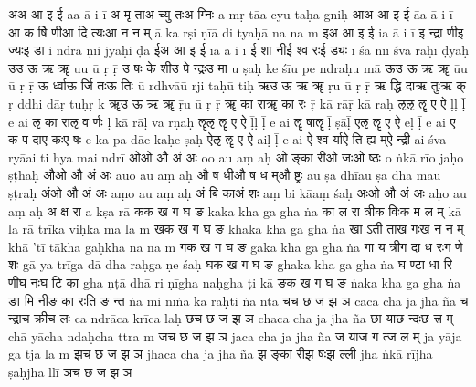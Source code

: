 \documentclass{article}
\begin{document}
\card
{अ}{अ आ इ ई}%
{a}{a ā i ī}
{{अ मृ ता}{अ च्यु तः}{अ ग्निः}}%
{{a mṛ tā}{a cyu taḥ}{a gniḥ}}
\card
{आ}{अ आ इ ई}%
{ā}{a ā i ī}
{{आ क र्षि णी}{आ दि त्यः}{आ न न म्}}%
{{ā ka rṣi ṇī}{ā di tyaḥ}{ā na na m}}
\card
{इ}{अ आ इ ई}%
{i}{a ā i ī}
{{इ न्द्रा णी}{इ ज्यः}{इ डा}}%
{{i ndrā ṇī}{i jyaḥ}{i ḍā}}
\card
{ई}{अ आ इ ई}%
{ī}{a ā i ī}
{{ई शा नी}{ई श्व रः}{ई ड्यः}}%
{{ī śā nī}{ī śva raḥ}{ī ḍyaḥ}}
\card
{उ}{उ ऊ ऋ ॠ}%
{u}{u ū ṛ ṝ}
{{उ षः के शी}{उ पे न्द्रः}{उ मा}}%
{{u ṣaḥ ke śī}{u pe ndraḥ}{u mā}}
\card
{ऊ}{उ ऊ ऋ ॠ}%
{ū}{u ū ṛ ṝ}
{{ऊ र्ध्वा}{ऊ र्जि तः}{ऊ तिः}}%
{{ū rdhvā}{ū rji taḥ}{ū tiḥ}}
\card
{ऋ}{उ ऊ ऋ ॠ}%
{ṛ}{u ū ṛ ṝ}
{{ऋ द्धि दा}{ऋ तुः}{ऋ क्}}%
{{ṛ ddhi dā}{ṛ tuḥ}{ṛ k}}
\card
{ॠ}{उ ऊ ऋ ॠ}%
{ṝ}{u ū ṛ ṝ}
{{ॠ का रा}{ॠ का रः}{ }}%
{{ṝ kā rā}{ṝ kā raḥ}{ }}
\card
{ऌ}{ऌ ॡ ए ऐ}%
{ḷ}{ḷ ḹ e ai}
{{ऌ का रा}{ऌ व र्णः}{ }}%
{{ḷ kā rā}{ḷ va rṇaḥ}{ }}
\card
{ॡ}{ऌ ॡ ए ऐ}%
{ḹ}{ḷ ḹ e ai}
{{ॡ षा}{ॡ}{ }}%
{{ḹ ṣā}{ḹ}{ }}
\card
{ए}{ऌ ॡ ए ऐ}%
{e}{ḷ ḹ e ai}
{{ए क प दा}{ए कः}{ए षः}}%
{{e ka pa dā}{e kaḥ}{e ṣaḥ}}
\card
{ऐ}{ऌ ॡ ए ऐ}%
{ai}{ḷ ḹ e ai}
{{ऐ श्व र्या}{ऐ ति ह्य म्}{ऐ न्द्री}}%
{{ai śva ryā}{ai ti hya m}{ai ndrī}}
\card
{ओ}{ओ औ अं अः}%
{o}{o au aṃ aḥ}
{{ओ ङ्का री}{ओ जः}{ओ ष्ठः}}%
{{o ṅkā rī}{o jaḥ}{o ṣṭhaḥ}}
\card
{औ}{ओ औ अं अः}%
{au}{o au aṃ aḥ}
{{औ ष धी}{औ ष ध म्}{औ ष्ट्रः}}%
{{au ṣa dhī}{au ṣa dha m}{au ṣṭraḥ}}
\card
{अं}{ओ औ अं अः}%
{aṃ}{o au aṃ aḥ}
{{अं बि का}{अं शः}{ }}%
{{aṃ bi kā}{aṃ śaḥ}{ }}
\card
{अः}{ओ औ अं अः}%
{aḥ}{o au aṃ aḥ}
{{अ क्ष रा}{ }{ }}%
{{a kṣa rā}{ }{ }}
\card
{क}{क ख ग घ ङ}%
{ka}{ka kha ga gha ṅa}
{{का ल रा त्री}{क विः}{क म ल म्}}%
{{kā la rā trī}{ka viḥ}{ka ma la m}}
\card
{ख}{क ख ग घ ङ}%
{kha}{ka kha ga gha ṅa}
{{खा ऽती ता}{ख गः}{ख न न म्}}%
{{khā 'tī tā}{kha gaḥ}{kha na na m}}
\card
{ग}{क ख ग घ ङ}%
{ga}{ka kha ga gha ṅa}
{{गा य त्री}{ग दा ध रः}{ग णे शः}}%
{{gā ya trī}{ga dā dha raḥ}{ga ṇe śaḥ}}
\card
{घ}{क ख ग घ ङ}%
{gha}{ka kha ga gha ṅa}
{{घ ण्टा धा रि णी}{घ नः}{घ टि का}}%
{{gha ṇṭā dhā ri ṇī}{gha naḥ}{gha ṭi kā}}
\card
{ङ}{क ख ग घ ङ}%
{ṅa}{ka kha ga gha ṅa}
{{ङा मि नी}{ङ का रः}{ति ङ न्त}}%
{{ṅā mi nī}{ṅa kā raḥ}{ti ṅa nta}}
\card
{च}{च छ ज झ ञ}%
{ca}{ca cha ja jha ña}
{{च न्द्रा}{च क्री}{च लः}}%
{{ca ndrā}{ca krī}{ca laḥ}}
\card
{छ}{च छ ज झ ञ}%
{cha}{ca cha ja jha ña}
{{छा या}{छ न्दः}{छ त्त्र म्}}%
{{chā yā}{cha ndaḥ}{cha ttra m}}
\card
{ज}{च छ ज झ ञ}%
{ja}{ca cha ja jha ña}
{{ज या}{ज ग त्}{ज ल म्}}%
{{ja yā}{ja ga t}{ja la m}}
\card
{झ}{च छ ज झ ञ}%
{jha}{ca cha ja jha ña}
{{झ ङ्का री}{झ षः}{झ ल्ली}}%
{{jha ṅkā rī}{jha ṣaḥ}{jha llī}}
\card
{ञ}{च छ ज झ ञ}%
\end{document}
